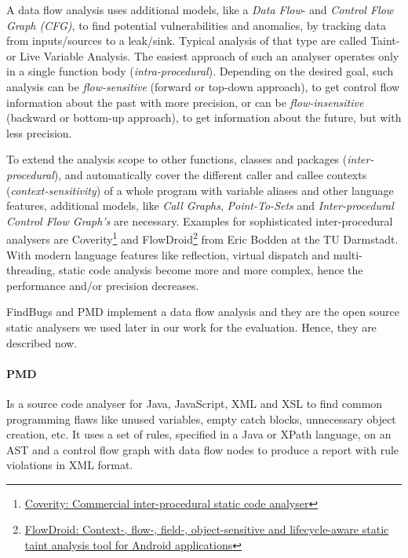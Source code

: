 \documentclass[conference]{IEEEtran}
\begin{document}
A data flow analysis uses additional models, like a \textit{Data Flow}- and \textit{Control Flow Graph (CFG)}, to find potential vulnerabilities and anomalies, by tracking data from inputs/sources to a leak/sink.
Typical analysis of that type are called Taint- or Live Variable Analysis.
The easiest approach of such an analyser operates only in a single function body (\textit{intra-procedural}).
Depending on the desired goal, such analysis can be \textit{flow-sensitive} (forward or top-down approach), to get control flow information about the past with more precision, or can be \textit{flow-insensitive} (backward or bottom-up approach), to get information about the future, but with less precision.


To extend the analysis scope to other functions, classes and packages (\textit{inter-procedural}), and automatically cover the different caller and callee contexts (\textit{context-sensitivity}) of a whole program with variable aliases and other language features, additional models, like \textit{Call Graphs}, \textit{Point-To-Sets} and \textit{Inter-procedural Control Flow Graph's} are necessary.
Examples for sophisticated inter-procedural analysers are Coverity\footnote{\href{https://www.coverity.com}{Coverity: Commercial inter-procedural static code analyser}} and FlowDroid\footnote{\href{http://sseblog.ec-spride.de/tools/flowdroid}{FlowDroid: Context-, flow-, field-, object-sensitive and lifecycle-aware static taint analysis tool for Android applications}} from Eric Bodden at the TU Darmstadt.
With modern language features like reflection, virtual dispatch and multi-threading, static code analysis become more and more complex, hence the performance and/or precision decreases.


FindBugs and PMD implement a data flow analysis and they are the open source static analysers we used later in our work for the evaluation.
Hence, they are described now.

\paragraph{PMD}
Is a source code analyser for Java, JavaScript, XML and XSL to find common programming flaws like unused variables, empty catch blocks, unnecessary object creation, etc.
It uses a set of rules, specified in a Java or XPath language, on an AST and a control flow graph with data flow nodes to produce a report with rule violations in XML format.
\end{document}
